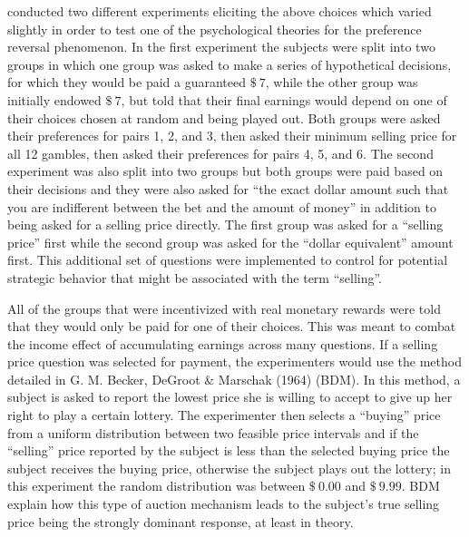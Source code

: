 \documentclass[11pt,a4paper]{report}
\newcommand{\money}[1]{$\$\!\:#1$}          %
\begin{document}
\textcite{Grether1979} conducted two different experiments eliciting the above choices which  varied slightly in order to test one of the psychological theories for the preference reversal phenomenon.
In the first experiment the subjects were split into two groups in which one group was asked to make a series of hypothetical decisions, for which they would be paid a guaranteed \money{7}, while the other group was initially endowed \money{7}, but told that their final earnings would depend on one of their choices chosen at random and being played out.
Both groups were asked their preferences for pairs 1, 2, and 3, then asked their minimum selling price for all 12 gambles, then asked their preferences for pairs 4, 5, and 6.
The second experiment was also split into two groups but both groups were paid based on their decisions and they were also asked for \enquote{the exact dollar amount such that you are indifferent between the bet and the amount of money} in addition to being asked for a selling price directly.
The first group was asked for a \enquote{selling price} first while the second group was asked for the \enquote{dollar equivalent} amount first.
This additional set of questions were implemented to control for potential strategic behavior that might be associated with the term \enquote{selling}.

All of the groups that were incentivized with real monetary rewards were told that they would only be paid for one of their choices.
This was meant to combat the income effect of accumulating earnings across many questions.
If a selling price question was selected for payment, the experimenters would use the method detailed in G. M. Becker, DeGroot \& Marschak (1964) (BDM).
In this method, a subject is asked to report the lowest price she is willing to accept to give up her right to play a certain lottery.
The experimenter then selects a \enquote{buying} price from a uniform distribution between two feasible price intervals and if the \enquote{selling} price reported by the subject is less than the selected buying price the subject receives the buying price, otherwise the subject plays out the lottery; in this experiment the random distribution was between \money{0.00} and \money{9.99}.
BDM explain how this type of auction mechanism leads to the subject's true selling price being the strongly dominant response, at least in theory.
\end{document}

